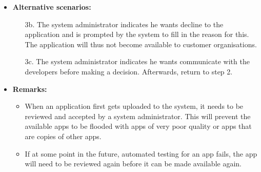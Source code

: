 \begin{itemize}
    \item \textbf{Alternative scenarios:}
        \begin{enumerate}
            \item [3b.] The system administrator indicates he wants decline to the application
                  and is prompted by the system to fill in the reason for this. The
                  application will thus not become available to customer organisations.
            \item [3c.] The system administrator indicates he wants communicate
                  with the developers before making a decision. Afterwards, return to
                  step 2.
        \end{enumerate}

    \item \textbf{Remarks:}
        \begin{itemize}
            \item When an application first gets uploaded to the system, it needs to be
                  reviewed and accepted by a system administrator. This will prevent
                  the available apps to be flooded with apps of very poor quality
                  or apps that are copies of other apps.
            \item If at some point in the future, automated testing for an app fails,
                  the app will need to be reviewed again before it can be made
                  available again.
        \end{itemize}
\end{itemize}
